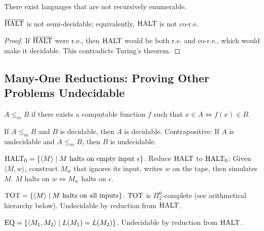 \begin{corollary}
There exist languages that are not recursively enumerable.
\end{corollary}

\begin{theorem}
$\overline{\text{HALT}}$ is not semi-decidable; equivalently, $\text{HALT}$ is not co-r.e.
\end{theorem}

\begin{proof}
If $\overline{\text{HALT}}$ were r.e., then $\text{HALT}$ would be both r.e. and co-r.e., which would make it decidable. This contradicts Turing's theorem.
\end{proof}

\subsection{Many-One Reductions: Proving Other Problems Undecidable}
\label{sec:halting:reductions}

\begin{definition}
$A \le_m B$ if there exists a computable function $f$ such that $x \in A \iff f(x) \in B$.
\end{definition}

\begin{proposition}
If $A \le_m B$ and $B$ is decidable, then $A$ is decidable. Contrapositive: If $A$ is undecidable and $A \le_m B$, then $B$ is undecidable.
\end{proposition}

\begin{example}
$\text{HALT}_0 = \{ \langle M \rangle \mid M \text{ halts on empty input } \epsilon \}$.
Reduce $\text{HALT}$ to $\text{HALT}_0$: Given $\langle M, w \rangle$, construct $M_w$ that ignores its input, writes $w$ on the tape, then simulates $M$. $M$ halts on $w \iff M_w$ halts on $\epsilon$.
\end{example}

\begin{example}
$\text{TOT} = \{ \langle M \rangle \mid M \text{ halts on all inputs} \}$.
$\text{TOT}$ is $\Pi^0_2$-complete (see arithmetical hierarchy below). Undecidable by reduction from $\text{HALT}$.
\end{example}

\begin{example}
$\text{EQ} = \{ \langle M_1, M_2 \rangle \mid L(M_1) = L(M_2) \}$.
Undecidable by reduction from $\text{HALT}$.
\end{example}

